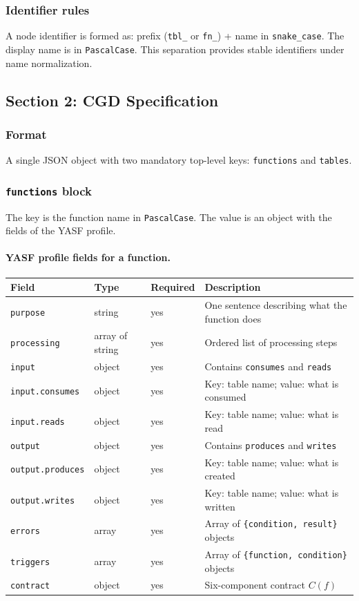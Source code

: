 \subsubsection{Identifier rules}

A node identifier is formed as: prefix (\texttt{tbl\_} or \texttt{fn\_}) + name in \texttt{snake\_case}. The display name is in \texttt{PascalCase}. This separation provides stable identifiers under name normalization.

\subsection{Section 2: CGD Specification}

\subsubsection{Format}

A single JSON object with two mandatory top-level keys: \texttt{functions} and \texttt{tables}.

\subsubsection{\texttt{functions} block}

The key is the function name in \texttt{PascalCase}. The value is an object with the fields of the YASF profile.

\paragraph{YASF profile fields for a function.}

\begin{tabular}{llll}
\hline
\textbf{Field} & \textbf{Type} & \textbf{Required} & \textbf{Description} \\
\hline
\texttt{purpose} & string & yes & One sentence describing what the function does \\
\texttt{processing} & array of string & yes & Ordered list of processing steps \\
\texttt{input} & object & yes & Contains \texttt{consumes} and \texttt{reads} \\
\texttt{input.consumes} & object & yes & Key: table name; value: what is consumed \\
\texttt{input.reads} & object & yes & Key: table name; value: what is read \\
\texttt{output} & object & yes & Contains \texttt{produces} and \texttt{writes} \\
\texttt{output.produces} & object & yes & Key: table name; value: what is created \\
\texttt{output.writes} & object & yes & Key: table name; value: what is written \\
\texttt{errors} & array & yes & Array of \texttt{\{condition, result\}} objects \\
\texttt{triggers} & array & yes & Array of \texttt{\{function, condition\}} objects \\
\texttt{contract} & object & yes & Six-component contract $C(f)$ \\
\hline
\end{tabular}

